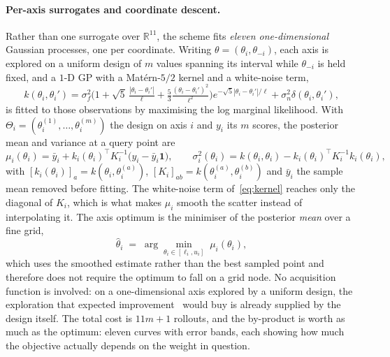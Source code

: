 \documentclass[11pt,a4paper]{article}
\newcommand{\R}{\mathbb{R}}
\begin{document}
\paragraph{Per-axis surrogates and coordinate descent.} Rather than one surrogate over $\R^{11}$, the scheme
fits \emph{eleven one-dimensional} Gaussian processes, one per coordinate. Writing
$\theta=(\theta_i,\theta_{-i})$, each axis is explored on a uniform design of $m$ values spanning its
interval while $\theta_{-i}$ is held fixed, and a $1$-D GP with a Mat\'ern-$5/2$ kernel and a white-noise
term,
\begin{equation}
  k(\theta_i,\theta_i')=\sigma_f^2\Big(1+\sqrt5\,\tfrac{|\theta_i-\theta_i'|}{\ell}
  +\tfrac53\tfrac{(\theta_i-\theta_i')^2}{\ell^2}\Big)e^{-\sqrt5|\theta_i-\theta_i'|/\ell}
  +\sigma_n^2\delta(\theta_i,\theta_i'),
  \label{eq:kernel}
\end{equation}
is fitted to those observations by maximising the log marginal likelihood. With
$\Theta_i=(\theta_i^{(1)},\dots,\theta_i^{(m)})$ the design on axis $i$ and $y_i$ its $m$ scores, the
posterior mean and variance at a query point are
\begin{equation}
  \mu_i(\theta_i)=\bar y_i+k_i(\theta_i)^{\!\top}K_i^{-1}\big(y_i-\bar y_i\mathbf{1}\big),
  \qquad
  \sigma_i^2(\theta_i)=k(\theta_i,\theta_i)-k_i(\theta_i)^{\!\top}K_i^{-1}k_i(\theta_i),
  \label{eq:gppost}
\end{equation}
with $[k_i(\theta_i)]_a=k(\theta_i,\theta_i^{(a)})$, $[K_i]_{ab}=k(\theta_i^{(a)},\theta_i^{(b)})$ and
$\bar y_i$ the sample mean removed before fitting. The white-noise term of~\eqref{eq:kernel} reaches only
the diagonal of $K_i$, which is what makes $\mu_i$ smooth the scatter instead of interpolating it. The axis
optimum is the minimiser of the posterior \emph{mean} over a fine grid,
\begin{equation}
  \hat\theta_i \;=\; \arg\min_{\theta_i\in[\ell_i,u_i]}\; \mu_i(\theta_i),
  \label{eq:axisopt}
\end{equation}
which uses the smoothed estimate rather than the best sampled point and therefore does not require the
optimum to fall on a grid node. No acquisition function is involved: on a one-dimensional axis explored by
a uniform design, the exploration that expected improvement~\cite{jones1998ego} would buy is already
supplied by the design itself. The total cost is $11m+1$ rollouts, and the by-product is worth as much as
the optimum: eleven curves with error bands, each showing how much the objective actually depends on the
weight in question.
\end{document}
